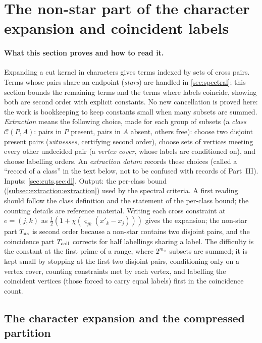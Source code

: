 
\section{The non-star part of the character expansion and coincident labels}\label{sec:extraction}

\paragraph{What this section proves and how to read it.}
Expanding a cut kernel in characters gives terms indexed by sets of
cross pairs. Terms whose pairs share an endpoint (\emph{stars}) are
handled in \cref{sec:spectral}; this section bounds the remaining
terms and the terms where labels coincide, showing both are second
order with explicit constants. No new cancellation is proved here:
the work is bookkeeping to keep constants small when many subsets
are summed. \emph{Extraction} means the following choice, made for
each group of subsets (a \emph{class} $\mathcal C(P,A)$: pairs in
$P$ present, pairs in $A$ absent, others free): choose two disjoint
present pairs (\emph{witnesses}, certifying second order), choose
sets of vertices meeting every other undecided pair (a \emph{vertex
cover}, whose labels are conditioned on), and choose labelling
orders. An \emph{extraction datum} records these choices (called a
``record of a class'' in the text below, not to be confused with
records of Part~III). Inputs: \cref{sec:cuts,sec:dl}. Output: the
per-class bound (\cref{subsec:extraction:extraction}) used by the
spectral criteria. A first reading should follow the class
definition and the statement of the per-class bound; the counting
details are reference material. Writing each cross constraint at $e=(j,k)$ as
$\tfrac12(1+\chi(\varsigma_{jk}(x'_k-x_j)))$ gives the expansion; the non-star part
$T_{\rm ns}$ is second order because a non-star contains two
disjoint pairs, and the coincidence part $T_{\rm coll}$ corrects for
half labellings sharing a label. The difficulty is the constant at
the first prime of a range, where $2^{m_\times}$ subsets are summed;
it is kept small by stopping at the first two disjoint pairs,
conditioning only on a vertex cover, counting constraints met by
each vertex, and labelling the coincident vertices (those forced
to carry equal labels) first in the coincidence count.

\subsection{The character expansion and the compressed partition}\label{subsec:extraction:partition}

